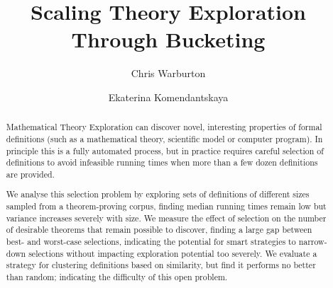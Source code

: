 \documentclass[]{article}
\begin{document}
\mainmatter  %

\title{Scaling Theory Exploration Through Bucketing}


%
%
\author{Chris Warburton%
\and Ekaterina Komendantskaya}
%


%
%

\maketitle

\begin{abstract}
  Mathematical Theory Exploration can discover novel, interesting properties of
  formal definitions (such as a mathematical theory, scientific model or
  computer program). In principle this is a fully automated process, but in
  practice requires careful selection of definitions to avoid infeasible running
  times when more than a few dozen definitions are provided.

  We analyse this selection problem by exploring sets of definitions of
  different sizes sampled from a theorem-proving corpus, finding median running
  times remain low but variance increases severely with size. We measure the
  effect of selection on the number of desirable theorems that remain possible
  to discover, finding a large gap between best- and worst-case selections,
  indicating the potential for smart strategies to narrow-down selections
  without impacting exploration potential too severely. We evaluate a strategy
  for clustering definitions based on similarity, but find it performs no better
  than random; indicating the difficulty of this open problem.
\end{abstract}
\end{document}
